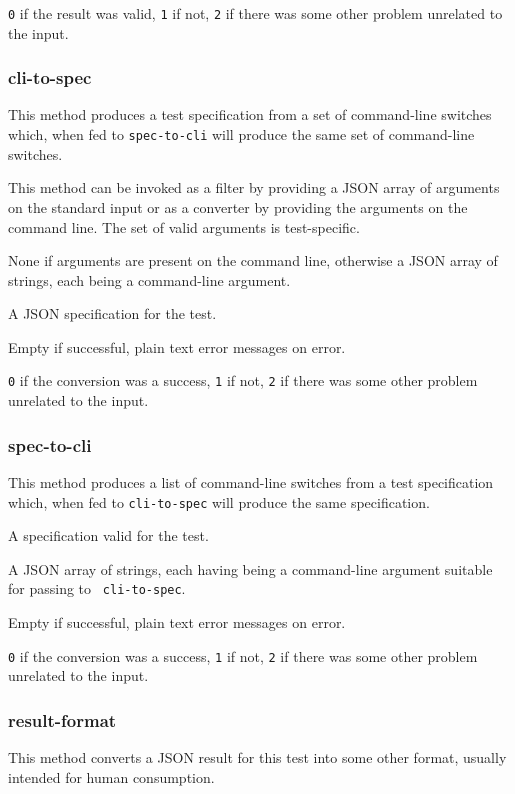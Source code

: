 \documentclass[10pt,titlepage]{article}
\begin{document}
 {\tt 0} if the result was valid, {\tt 1} if
not, {\tt 2} if there was some other problem unrelated to the input.



\subsubsection{cli-to-spec}
This method produces a test specification from a set of command-line
switches which, when fed to {\tt spec-to-cli} will produce the same
set of command-line switches.

This method can be invoked as a filter by providing a JSON array of
arguments on the standard input or as a converter by providing the
arguments on the command line.  The set of valid arguments is
test-specific.

 None if arguments are present on the
command line, otherwise a JSON array of strings, each being a
command-line argument.

 A JSON specification for the test.

 Empty if successful, plain text error
messages on error.

 {\tt 0} if the conversion was a success,
            {\tt 1} if not, {\tt 2} if there was some other problem
            unrelated to the input.



\subsubsection{spec-to-cli}
This method produces a list of command-line switches from a test
specification which, when fed to {\tt cli-to-spec} will produce the
same specification.

 A specification valid for the test.

 A JSON array of strings, each having
being a command-line argument suitable for passing to {\tt
  cli-to-spec}.

 Empty if successful, plain text error
messages on error.

 {\tt 0} if the conversion was a success,
            {\tt 1} if not, {\tt 2} if there was some other problem
            unrelated to the input.


\subsubsection{result-format}
This method converts a JSON result for this test into some other
format, usually intended for human consumption.
\end{document}
